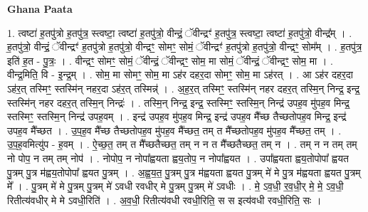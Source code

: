 \documentclass[17pt]{extarticle}
\begin{document}
\textbf{Ghana Paata } \newline

1. त्वष्टा॑ ह॒तपु॑त्रो ह॒तपु॑त्र॒ स्त्वष्टा॒ त्वष्टा॑ ह॒तपु॑त्रो॒ वीन्द्रं॒ ॅवीन्द्रꣳ॑ ह॒तपु॑त्र॒ स्त्वष्टा॒ त्वष्टा॑ ह॒तपु॑त्रो॒ वीन्द्र᳚म् । . ह॒तपु॑त्रो॒ वीन्द्रं॒ ॅवीन्द्रꣳ॑ ह॒तपु॑त्रो ह॒तपु॑त्रो॒ वीन्द्रꣳ॒॒ सोमꣳ॒॒ सोमं॒ ॅवीन्द्रꣳ॑ ह॒तपु॑त्रो ह॒तपु॑त्रो॒ वीन्द्रꣳ॒॒ सोम᳚म् । . ह॒तपु॑त्र॒ इति॑ ह॒त - पु॒त्रः॒ । . वीन्द्रꣳ॒॒ सोमꣳ॒॒ सोमं॒ ॅवीन्द्रं॒ ॅवीन्द्रꣳ॒॒ सोम॒ मा सोमं॒ ॅवीन्द्रं॒ ॅवीन्द्रꣳ॒॒ सोम॒ मा । . वीन्द्र॒मिति॒ वि - इ॒न्द्र॒म् । . सोम॒ मा सोमꣳ॒॒ सोम॒ मा ऽह॑र दहर॒दा सोमꣳ॒॒ सोम॒ मा ऽह॑रत् । . आ ऽह॑र दहर॒दा ऽह॑र॒त् तस्मिꣳ॒॒ स्तस्मि॑न् नहर॒दा ऽह॑र॒त् तस्मिन्न्॑ । . अ॒ह॒र॒त् तस्मिꣳ॒॒ स्तस्मि॑न् नहर दहर॒त् तस्मि॒न् निन्द्र॒ इन्द्र॒ स्तस्मि॑न् नहर दहर॒त् तस्मि॒न् निन्द्रः॑ । . तस्मि॒न् निन्द्र॒ इन्द्र॒ स्तस्मिꣳ॒॒ स्तस्मि॒न् निन्द्र॑ उपह॒व मु॑पह॒व मिन्द्र॒ स्तस्मिꣳ॒॒ स्तस्मि॒न् निन्द्र॑ उपह॒वम् । . इन्द्र॑ उपह॒व मु॑पह॒व मिन्द्र॒ इन्द्र॑ उपह॒व मै᳚च्छ तैच्छतोपह॒व मिन्द्र॒ इन्द्र॑ उपह॒व मै᳚च्छत । . उ॒प॒ह॒व मै᳚च्छ तैच्छतोपह॒व मु॑पह॒व मै᳚च्छत॒ तम् त मै᳚च्छतोपह॒व मु॑पह॒व मै᳚च्छत॒ तम् । . उ॒प॒ह॒वमित्यु॑प - ह॒वम् । . ऐ॒च्छ॒त॒ तम् त मै᳚च्छतैच्छत॒ तम् न न त मै᳚च्छतैच्छत॒ तम् न । . तम् न न तम् तम् नो पोप॒ न तम् तम् नोप॑ । . नोपोप॒ न नोपा᳚ह्वयता ह्वय॒तोप॒ न नोपा᳚ह्वयत । . उपा᳚ह्वयता ह्वय॒तोपोपा᳚ ह्वयत पु॒त्रम् पु॒त्र म॑ह्वय॒तोपोपा᳚ ह्वयत पु॒त्रम् । . अ॒ह्व॒य॒त॒ पु॒त्रम् पु॒त्र म॑ह्वयता ह्वयत पु॒त्रम् मे॑ मे पु॒त्र म॑ह्वयता ह्वयत पु॒त्रम् मे᳚ । . पु॒त्रम् मे॑ मे पु॒त्रम् पु॒त्रम् मे॑ ऽवधी रवधीर् मे पु॒त्रम् पु॒त्रम् मे॑ ऽवधीः । . मे॒ ऽव॒धी॒ र॒व॒धी॒र् मे॒ मे॒ ऽव॒धी॒ रितीत्य॑वधीर् मे मे ऽवधी॒रिति॑ । . अ॒व॒धी॒ रितीत्य॑वधी रवधी॒रिति॒ स स इत्य॑वधी रवधी॒रिति॒ सः । \newline
\end{document}
